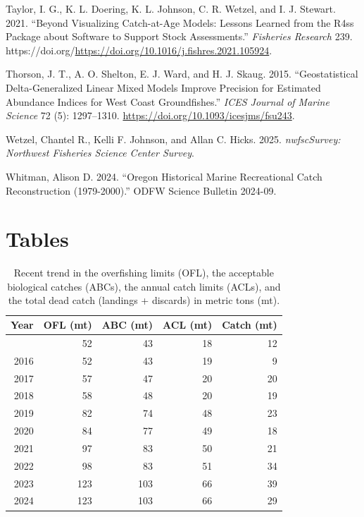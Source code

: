 \documentclass[
  english,
]{article}
\newlength{\cslhangindent}
\newenvironment{CSLReferences}[2] %
 {\begin{list}{}{%
  \setlength{\itemindent}{0pt}
  \setlength{\leftmargin}{0pt}
  \setlength{\parsep}{0pt}
  \ifodd #1
   \setlength{\leftmargin}{\cslhangindent}
   \setlength{\itemindent}{-1\cslhangindent}
  \fi
  \setlength{\itemsep}{#2\baselineskip}}}
 {\end{list}}
\begin{document}
\begin{CSLReferences}{1}{0}
Taylor, I. G., K. L. Doering, K. L. Johnson, C. R. Wetzel, and I. J.
Stewart. 2021. {``Beyond Visualizing Catch-at-Age Models: Lessons
Learned from the R4ss Package about Software to Support Stock
Assessments.''} \emph{Fisheries Research} 239.
https://doi.org/\url{https://doi.org/10.1016/j.fishres.2021.105924}.

Thorson, J. T., A. O. Shelton, E. J. Ward, and H. J. Skaug. 2015.
{``Geostatistical Delta-Generalized Linear Mixed Models Improve
Precision for Estimated Abundance Indices for {West} {Coast}
Groundfishes.''} \emph{ICES Journal of Marine Science} 72 (5):
1297--1310. \url{https://doi.org/10.1093/icesjms/fsu243}.

Wetzel, Chantel R., Kelli F. Johnson, and Allan C. Hicks. 2025.
\emph{nwfscSurvey: Northwest Fisheries Science Center Survey}.

Whitman, Alison D. 2024. {``Oregon Historical Marine Recreational Catch
Reconstruction (1979-2000).''} ODFW Science Bulletin 2024-09.

\end{CSLReferences}

\newpage{}

\section{Tables}\label{tables}

\begingroup
\fontsize{9.0pt}{11.0pt}\selectfont

\begin{longtable}{rrrrr}

\caption{\label{tbl-ye-management}Recent trend in the overfishing limits
(OFL), the acceptable biological catches (ABCs), the annual catch limits
(ACLs), and the total dead catch (landings + discards) in metric tons
(mt).}

\tabularnewline

\toprule
Year & OFL (mt) & ABC (mt) & ACL (mt) & Catch (mt) \\ 
\midrule\addlinespace[2.5pt]
2015 & 52 & 43 & 18 & 12 \\ 
2016 & 52 & 43 & 19 & 9 \\ 
2017 & 57 & 47 & 20 & 20 \\ 
2018 & 58 & 48 & 20 & 19 \\ 
2019 & 82 & 74 & 48 & 23 \\ 
2020 & 84 & 77 & 49 & 18 \\ 
2021 & 97 & 83 & 50 & 21 \\ 
2022 & 98 & 83 & 51 & 34 \\ 
2023 & 123 & 103 & 66 & 39 \\ 
2024 & 123 & 103 & 66 & 29 \\ 
\bottomrule

\end{longtable}
\end{document}

